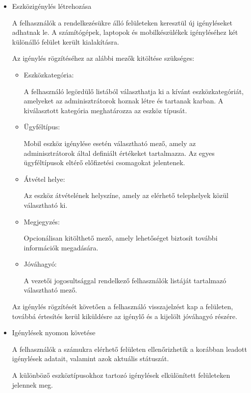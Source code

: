 \documentclass[
]{thesis-ekf}
\theoremstyle{definition}
\theoremstyle{remark}
\begin{document}
\begin{itemize}
	\item Eszközigénylés létrehozása
	
	A felhasználók a rendelkezésükre álló felületeken keresztül új igényléseket adhatnak le. A számítógépek, laptopok és mobilkészülékek igényléséhez két különálló felület került kialakításra.
	
	Az igénylés rögzítéséhez az alábbi mezők kitöltése szükséges:
	
	\begin{itemize}
		\item Eszközkategória:
			
		A felhasználó legördülő listából választhatja ki a kívánt eszközkategóriát, amelyeket az adminisztrátorok hoznak létre és tartanak karban. A kiválasztott kategória meghatározza az eszköz típusát.
		
		\item Ügyféltípus:
		
		Mobil eszköz igénylése esetén választható mező, amely az adminisztrátorok által definiált értékeket tartalmazza. Az egyes ügyféltípusok eltérő előfizetési csomagokat jelentenek.
		
		\item Átvétel helye:
		
		Az eszköz átvételének helyszíne, amely az elérhető telephelyek közül választható ki.
		
		\item Megjegyzés:
		
		Opcionálisan kitölthető mező, amely lehetőséget biztosít további információk megadására.
		
		\item Jóváhagyó:
		
		A vezetői jogosultsággal rendelkező felhasználók listáját tartalmazó választható mező.
		
	\end{itemize}
	
	Az igénylés rögzítését követően a felhasználó visszajelzést kap a felületen, továbbá értesítés kerül kiküldésre az igénylő és a kijelölt jóváhagyó részére.
	
	\item Igénylések nyomon követése
	
	A felhasználók a számukra elérhető felületen ellenőrizhetik a korábban leadott igénylések adatait, valamint azok aktuális státuszát.
	
	A különböző eszköztípusokhoz tartozó igénylések elkülönített felületeken jelennek meg.
	

\end{itemize}
\end{document}
